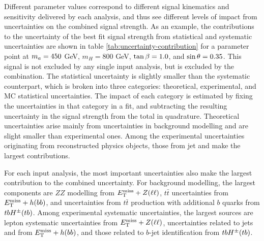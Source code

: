 Different \thdma parameter values correspond to different signal kinematics and sensitivity delivered by each analysis, and thus see different levels of impact from uncertainties on the combined signal strength. As an example, the contributions to the uncertainty of the best fit signal strength from statistical and systematic uncertainties are shown in table \ref{tab:uncertainty-contribution} for a parameter point at $m_a=450$ GeV, $m_H=800$ GeV, $\tan\beta=1.0$, and $\sin\theta=0.35$. This signal is not excluded by any single input analysis, but is excluded by the combination. The statistical uncertainty is slightly smaller than the systematic counterpart, which is broken into three categories: theoretical, experimental, and MC statistical uncertainties. The impact of each category is estimated by fixing the uncertainties in that category in a fit, and subtracting the resulting uncertainty in the signal strength from the total in quadrature. Theoretical uncertainties arise mainly from uncertainties in background modelling and are slight smaller than experimental ones. Among the experimental uncertainties originating from reconstructed physics objects, those from jet and \met make the largest contributions. 

For each input analysis, the most important uncertainties also make the largest contribution to the combined uncertainty. For background modelling, the largest components are $ZZ$ modelling from $E_{\mathrm{T}}^{\mathrm{miss}}+Z(\ell\ell)$, $t\bar{t}$ uncertainties from $E_{\mathrm{T}}^{\mathrm{miss}}+h(bb)$, and uncertainties from $t\bar{t}$ production with additional $b$ quarks from $tbH^{\pm}(tb)$. Among experimental systematic uncertainties, the largest sources are lepton systematic uncertainties from $E_{\mathrm{T}}^{\mathrm{miss}}+Z(\ell\ell)$, uncertainties related to jets and \met from $E_{\mathrm{T}}^{\mathrm{miss}}+h(bb)$, and those related to $b$-jet identification from $tbH^{\pm}(tb)$.

